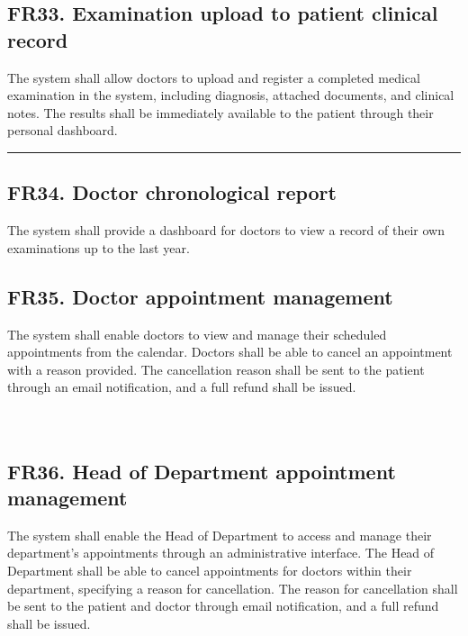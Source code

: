 \documentclass[12pt, a4paper]{article}
\begin{document}
\subsection{FR33. Examination upload to patient clinical record} \label{FR33}
The system shall allow doctors to upload and register a completed medical examination in the system, including diagnosis, attached documents, and clinical notes. The results shall be immediately available to the patient through their personal dashboard.
\\ 

\noindent\rule{\textwidth}{0.4pt}
\medskip

\subsection{FR34. Doctor chronological report} \label{FR34}
The system shall provide a dashboard for doctors to view a record of their own examinations up to the last year.
\\ 

\subsection{FR35. Doctor appointment management} \label{FR35}
    The system shall enable doctors to view and manage their scheduled appointments from the calendar. Doctors shall be able to cancel an appointment with a reason provided. The cancellation reason shall be sent to the patient through an email notification, and a full refund shall be issued.
\\ 
\\ 
\\ 

\subsection{FR36. Head of Department appointment management} \label{FR36}
The system shall enable the Head of Department to access and manage their department's appointments through an administrative interface. The Head of Department shall be able to cancel appointments for doctors within their department, specifying a reason for cancellation. The reason for cancellation shall be sent to the patient and doctor through email notification, and a full refund shall be issued.
\\ 
\\ 
\end{document}
